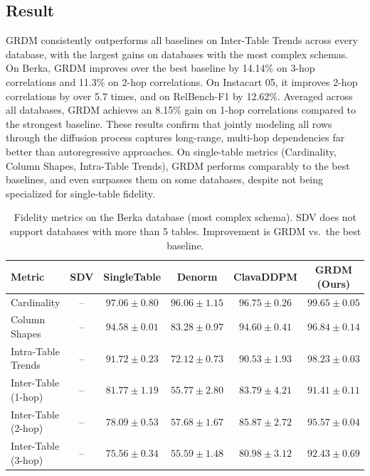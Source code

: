 \documentclass[manuscript,review]{acmart}
\begin{document}
\subsection{Result}
GRDM consistently outperforms all baselines on Inter-Table Trends across every database, with the largest gains on databases with the most complex schemas. On Berka, GRDM improves over the best baseline by 14.14\% on 3-hop correlations and 11.3\% on 2-hop correlations. On Instacart 05, it improves 2-hop correlations by over 5.7 times, and on RelBench-F1 by 12.62\%. Averaged across all databases, GRDM achieves an 8.15\% gain on 1-hop correlations compared to the strongest baseline. These results confirm that jointly modeling all rows through the diffusion process captures long-range, multi-hop dependencies far better than autoregressive approaches. On single-table metrics (Cardinality, Column Shapes, Intra-Table Trends), GRDM performs comparably to the best baselines, and even surpasses them on some databases, despite not being specialized for single-table fidelity.
\begin{table}[t]
    \centering
    \caption{Fidelity metrics on the Berka database (most complex schema). SDV does not support databases with more than 5 tables. Improvement is GRDM vs.\ the best baseline.}
    \label{tab:berka}
    \begin{tabular}{lccccc}
         \toprule
         Metric & SDV & SingleTable & Denorm & ClavaDDPM & GRDM (Ours) \\
         \midrule
        Cardinality            &--& $97.06 \pm 0.80 $ & $96.06 \pm 1.15$ & $96.75 \pm 0.26$ & $\mathbf{99.65 \pm 0.05}$ \\
        Column Shapes          & -- & $94.58 \pm 0.01$ & $83.28 \pm 0.97$ & $94.60 \pm 0.41$ & $\mathbf{96.84 \pm 0.14}$ \\
        Intra-Table Trends      & -- & $91.72 \pm 0.23$ & $72.12 \pm 0.73$ & $90.53 \pm 1.93$ & $\mathbf{98.23 \pm 0.03}$ \\
        Inter-Table (1-hop)     & -- & $81.77 \pm 1.19$ & $55.77 \pm 2.80$ & $83.79 \pm 4.21$ & $\mathbf{91.41 \pm 0.11}$ \\
        Inter-Table (2-hop)     & -- & $78.09 \pm 0.53$ & $57.68 \pm 1.67$ & $85.87 \pm 2.72$ & $\mathbf{95.57 \pm 0.04}$ \\
        Inter-Table (3-hop)     & -- & $75.56 \pm 0.34$ & $55.59 \pm 1.48$ & $80.98 \pm 3.12$ & $\mathbf{92.43 \pm 0.69}$ \\
        \bottomrule
    \end{tabular}
\end{table}
\end{document}
